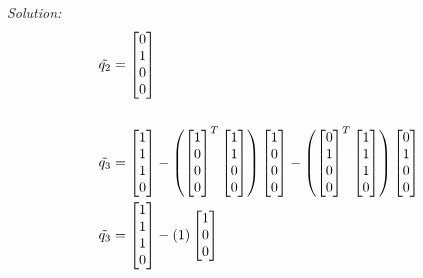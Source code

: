 \documentclass{article}
\newenvironment{solution}
    {\textit{Solution:}}
    {}
\begin{document}
\begin{solution}
\begin{align*}
    \Tilde{q_2} &= \begin{bmatrix}0\\ 1\\ 0\\ 0\end{bmatrix} \\
    \\
    \Tilde{q_3} &= \begin{bmatrix}1\\ 1\\ 1\\ 0\end{bmatrix} - \left( \begin{bmatrix}1\\ 0\\ 0\\
    0\end{bmatrix}^T \begin{bmatrix}1\\ 1\\ 0\\ 0\end{bmatrix}\right) \begin{bmatrix}1\\ 0\\ 0\\
    0\end{bmatrix} - \left( \begin{bmatrix}0\\ 1\\ 0\\ 0\end{bmatrix}^T \begin{bmatrix}1\\ 1\\ 1\\ 0\end{bmatrix}\right) \begin{bmatrix}0\\ 1\\ 0\\ 0\end{bmatrix}\\
    \Tilde{q_3} &= \begin{bmatrix}1\\ 1\\ 1\\ 0\end{bmatrix} - \left(1\right) \begin{bmatrix}1\\ 0\\ 0\\

\end{bmatrix}
\end{align*}
\end{solution}
\end{document}
